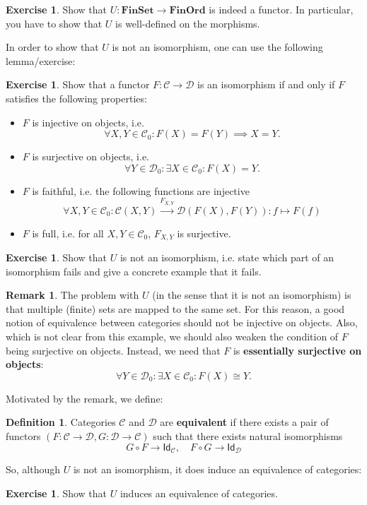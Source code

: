 \documentclass[a4paper,11pt, oneside,titlepage=false]{scrbook}
\theoremstyle{plain}
\theoremstyle{definition}
\newtheorem{rem}[thm]{Remark}
\newtheorem{dfn}[thm]{Definition}
\newtheorem{exer}[thm]{Exercise}
\newcommand{\cfont}[1]{\ensuremath{\mathsf{#1}}}
\newcommand{\Cat}[1]{\mathcal{#1}}
\newcommand{\CC}{\Cat{C}}
\newcommand{\DD}{\Cat{D}}
\newcommand{\Catb}[1]{\mathbf{#1}}
\newcommand{\FINSET}{\Catb{FinSet}}
\newcommand{\Ob}[1]{{#1}_0}
\newcommand{\CHom}[3]{{#1}(#2,#3)}
\newcommand{\Id}[1][]{\cfont{Id}_{#1}}
\newcommand{\co}[2]{\ensuremath{#2 \circ #1}}
\begin{document}
\begin{exer} Show that $U: \FINSET\to \Catb{FinOrd}$ is indeed a functor. In particular, you have to show that $U$ is well-defined on the morphisms.
\end{exer}

In order to show that $U$ is not an isomorphism, one can use the following lemma/exercise:
\begin{exer} Show that a functor $F:\CC\to\DD$ is an isomorphism if and only if $F$ satisfies the following properties:
\begin{itemize}
\item $F$ is injective on objects, i.e. 
\[
\forall X,Y\in\Ob{\CC}: F(X) = F(Y) \implies X=Y.
\]
\item $F$ is surjective on objects, i.e. 
\[
\forall Y\in\Ob{\DD}: \exists X\in\Ob{\CC} : F(X) = Y.
\]
\item $F$ is faithful, i.e. the following functions are injective
\[
\forall X,Y\in\Ob{\CC}: \CHom{\CC}{X}{Y} \xrightarrow{F_{X,Y}} \CHom{\DD}{F(X)}{F(Y)} : f\mapsto F(f)
\]
\item $F$ is full, i.e. for all $X,Y\in \Ob{\CC}$, $F_{X,Y}$ is surjective.
\end{itemize}
\end{exer}

\begin{exer} Show that $U$ is not an isomorphism, i.e. state which part of an isomorphism fails and give a concrete example that it fails.
\end{exer}

\begin{rem} The problem with $U$ (in the sense that it is not an isomorphism) is that multiple (finite) sets are mapped to the same set. For this reason, a good notion of equivalence between categories should not be injective on objects. Also, which is not clear from this example, we should also weaken the condition of $F$ being surjective on objects. Instead, we need that $F$ is \textbf{essentially surjective on objects}:
\[
\forall Y\in\Ob{\DD}: \exists X\in\Ob{\CC} : F(X) \cong Y.
\]
\end{rem}
Motivated by the remark, we define:
\begin{dfn} Categories $\CC$ and $\DD$ are \textbf{equivalent} if there exists a pair of functors $(F:\CC\to\DD, G:\DD\to\CC)$ such that there exists natural isomorphisms 
\[
\co{F}{G} \to \Id[\CC], \quad \co{G}{F} \to \Id[\DD]
\]
\end{dfn}

So, although $U$ is not an isomorphism, it does induce an equivalence of categories:
\begin{exer} Show that $U$ induces an equivalence of categories.
\end{exer}
\end{document}
